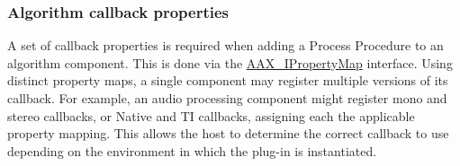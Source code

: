 \hypertarget{a00796_describe_component_properties}{}\subsubsection{Algorithm callback properties}\label{a00796_describe_component_properties}
 A set of callback properties is required when adding a Process Procedure to an algorithm component. This is done via the \mbox{\hyperlink{a01869}{A\+A\+X\+\_\+\+I\+Property\+Map}} interface. Using distinct property maps, a single component may register multiple versions of its callback. For example, an audio processing component might register mono and stereo callbacks, or Native and TI callbacks, assigning each the applicable property mapping. This allows the host to determine the correct callback to use depending on the environment in which the plug-\/in is instantiated.


